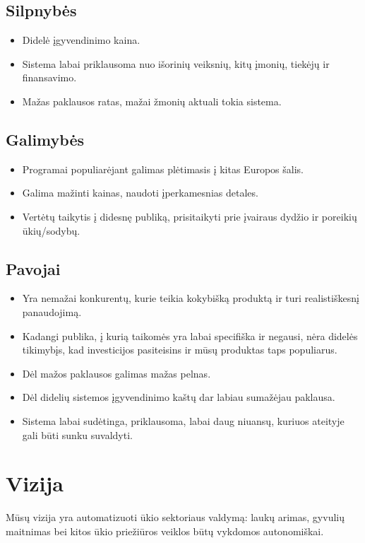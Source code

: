 \documentclass[oneside]{VUMIFPSkursinis}
\begin{document}
	\subsection{Silpnybės}
	\begin{itemize}
	\item Didelė įgyvendinimo kaina.
	\item Sistema labai priklausoma nuo išorinių veiksnių, kitų įmonių, tiekėjų ir finansavimo.
	\item Mažas paklausos ratas, mažai žmonių aktuali tokia sistema.
	\end{itemize}
	\subsection{Galimybės}
	\begin{itemize}
	\item Programai populiarėjant galimas plėtimasis į kitas Europos šalis.
	\item Galima mažinti kainas, naudoti įperkamesnias detales.
	\item Vertėtų taikytis į didesnę publiką, prisitaikyti prie įvairaus dydžio ir poreikių ūkių/sodybų.
	\end{itemize}
	\subsection{Pavojai}
	\begin{itemize}
	\item Yra nemažai konkurentų, kurie teikia kokybišką produktą ir turi realistiškesnį panaudojimą.
	\item Kadangi publika, į kurią taikomės yra labai specifiška ir negausi, nėra didelės tikimybįs, kad investicijos pasiteisins ir mūsų produktas taps populiarus.
	\item Dėl mažos paklausos galimas mažas pelnas.
	\item Dėl didelių sistemos įgyvendinimo kaštų dar labiau sumažėjau paklausa.
	\item Sistema labai sudėtinga, priklausoma, labai daug niuansų, kuriuos ateityje gali būti sunku suvaldyti.
	\end{itemize}
	
\section{Vizija}
Mūsų vizija yra automatizuoti ūkio sektoriaus valdymą: laukų arimas, gyvulių maitnimas bei kitos ūkio priežiūros veiklos būtų vykdomos autonomiškai.
\end{document}
